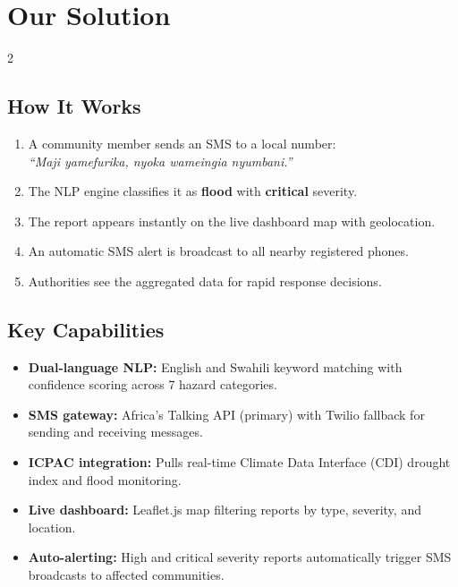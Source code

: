 \documentclass[11pt,a4paper]{article}
\begin{document}

\section{Our Solution}

\begin{multicols}{2}

\subsection{How It Works}
\begin{enumerate}[leftmargin=1.2em]
  \item A community member sends an SMS to a local number: \\ \textit{``Maji yamefurika, nyoka wameingia nyumbani.''}
  \item The NLP engine classifies it as \textbf{flood} with \textbf{critical} severity.
  \item The report appears instantly on the live dashboard map with geolocation.
  \item An automatic SMS alert is broadcast to all nearby registered phones.
  \item Authorities see the aggregated data for rapid response decisions.
\end{enumerate}

\columnbreak

\subsection{Key Capabilities}
\begin{itemize}[leftmargin=1.2em]
  \item \textbf{Dual-language NLP:} English and Swahili keyword matching with confidence scoring across 7 hazard categories.
  \item \textbf{SMS gateway:} Africa's Talking API (primary) with Twilio fallback for sending and receiving messages.
  \item \textbf{ICPAC integration:} Pulls real-time Climate Data Interface (CDI) drought index and flood monitoring.
  \item \textbf{Live dashboard:} Leaflet.js map filtering reports by type, severity, and location.
  \item \textbf{Auto-alerting:} High and critical severity reports automatically trigger SMS broadcasts to affected communities.
\end{itemize}

\end{multicols}
\end{document}
